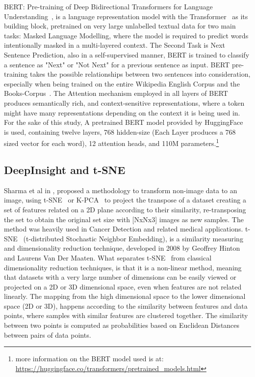 \documentclass[conference]{IEEEtran}
\begin{document}
			BERT: Pre-training of Deep Bidirectional Transformers for Language 
					Understanding~\cite{Bert}, is a language representation model with
					the Transformer~\cite{attention} as its building block,
					pretrained on very large unlabelled textual data for two main 
					tasks: Masked Language Modelling, where the model is required to 
					predict words intentionally masked in a multi-layered context. The Second Task is Next Sentence
					Prediction, also in a self-supervised manner, BERT is trained 
					to classify a sentence as "Next" or "Not Next" for a previous 
					sentence as input. BERT pre-training takes the possible relationships between two sentences into consideration, especially when being trained on the entire Wikipedia English Corpus and the Books-Corpus~\cite{bookcorpus}. The Attention mechanism employed in all layers of BERT produces semantically rich, and 
					context-sensitive representations, where a token might have many 
					representations depending on the context it is being used in.
					For the sake of this study, A pretrained BERT model provided by
					HuggingFace~\cite{huggingface} is used, containing twelve
					layers, 768 hidden-size (Each Layer produces a 768 sized vector for 
					each word), 12 attention heads, and 110M parameters.\footnote{more information on the BERT model used is at: 	\url{https://huggingface.co/transformers/pretrained_models.html}}


\subsection{DeepInsight and t-SNE}
                Sharma et al in \cite{deepinsight}, proposed a methodology to transform
				non-image data to an image, using t-SNE~\cite{tsne} or K-PCA~\cite{kpca} to project the transpose of a dataset creating a set of features related on a 2D plane according to their similarity, re-transposing the set to obtain the original set size with [NxNx3] images as new samples. The method was heavily used in Cancer Detection and related medical applications.
                t-SNE~\cite{tsne} (t-distributed Stochastic Neighbor Embedding), is a similarity measuring and dimensionality reduction technique, developed in 2008 by Geoffrey Hinton and Laurens Van Der Maaten. What separates t-SNE~\cite{tsne} from classical dimensionality reduction techniques, is that it is a non-linear method, meaning that datasets with a very large number of dimensions can be easily viewed or projected on a 2D or 3D dimensional space, even when features are not related linearly. The mapping from the high dimensional space to the lower dimensional space (2D or 3D), happens according to the similarity between features and data points, where samples with similar features are clustered together. The similarity between two points is computed as probabilities based on Euclidean Distances between pairs of data points. 
\end{document}
